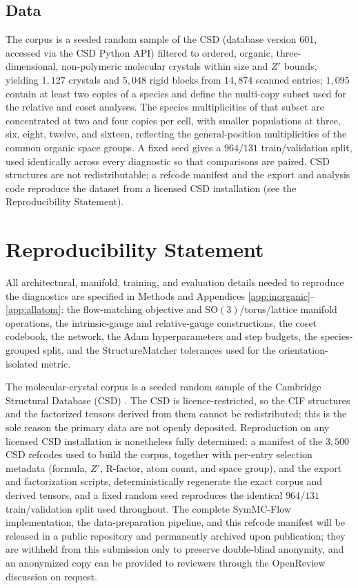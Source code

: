 \documentclass[10pt]{article}
\begin{document}
\subsection{Data}
The corpus is a seeded random sample of the CSD (database version 601, accessed
via the CSD Python API) \citep{groom2016csd} filtered to ordered, organic,
three-dimensional, non-polymeric molecular crystals within size and
$Z'$ bounds, yielding $1{,}127$ crystals and $5{,}048$ rigid blocks from
$14{,}874$ scanned entries; $1{,}095$ contain at least two copies of a species
and define the multi-copy subset used for the relative and coset analyses. The
species multiplicities of that subset are concentrated at two and four copies
per cell, with smaller populations at three, six, eight, twelve, and sixteen,
reflecting the general-position multiplicities of the common organic space
groups. A fixed seed gives a $964/131$ train/validation split, used identically
across every diagnostic so that comparisons are paired. CSD structures are not
redistributable; a refcode manifest and the export and analysis code reproduce
the dataset from a licensed CSD installation (see the Reproducibility Statement).

\section*{Reproducibility Statement}
All architectural, manifold, training, and evaluation details needed to
reproduce the diagnostics are specified in Methods and Appendices
\ref{app:inorganic}--\ref{app:allatom}: the flow-matching objective and
$\mathrm{SO}(3)$/torus/lattice manifold operations, the intrinsic-gauge and
relative-gauge constructions, the coset codebook, the network, the Adam
hyperparameters and step budgets, the species-grouped split, and the
StructureMatcher tolerances used for the orientation-isolated metric.

The molecular-crystal corpus is a seeded random sample of the Cambridge
Structural Database (CSD) \citep{groom2016csd}. The CSD is licence-restricted, so
the CIF structures and the factorized tensors derived from them cannot be
redistributed; this is the sole reason the primary data are not openly deposited.
Reproduction on any licensed CSD installation is nonetheless fully determined: a
manifest of the $3{,}500$ CSD refcodes used to build the corpus, together with
per-entry selection metadata (formula, $Z'$, R-factor, atom count, and space
group), and the export and factorization scripts, deterministically regenerate
the exact corpus and derived tensors, and a fixed random seed reproduces the
identical $964/131$ train/validation split used throughout. The complete
SymMC-Flow implementation, the data-preparation pipeline, and this refcode
manifest will be released in a public repository and permanently archived upon
publication; they are withheld from this submission only to preserve
double-blind anonymity, and an anonymized copy can be provided to reviewers
through the OpenReview discussion on request.
\end{document}
